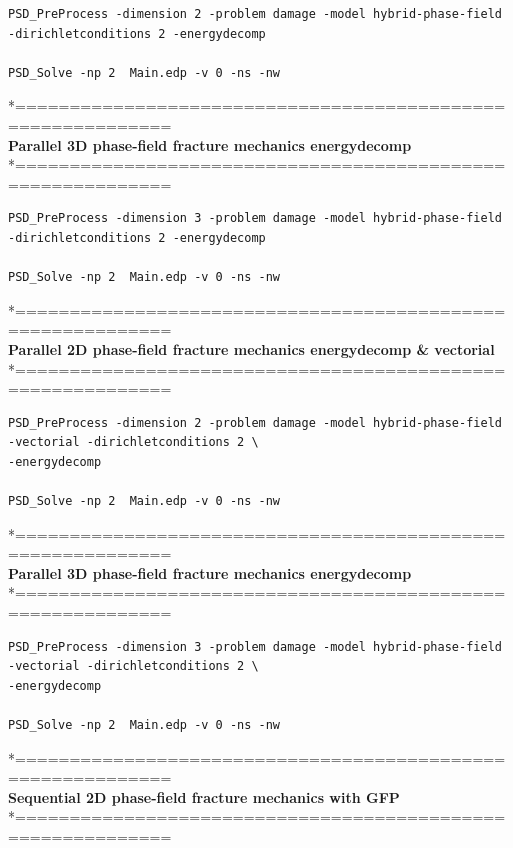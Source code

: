 \begin{lstlisting}[style=BashInputStyle]
PSD_PreProcess -dimension 2 -problem damage -model hybrid-phase-field -dirichletconditions 2 -energydecomp   

PSD_Solve -np 2  Main.edp -v 0 -ns -nw   
\end{lstlisting}
*============================================================\\
\textbf{ Parallel 3D phase-field fracture mechanics energydecomp }\\
*============================================================\\
\begin{lstlisting}[style=BashInputStyle]
PSD_PreProcess -dimension 3 -problem damage -model hybrid-phase-field -dirichletconditions 2 -energydecomp   

PSD_Solve -np 2  Main.edp -v 0 -ns -nw   
\end{lstlisting}
*============================================================\\
\textbf{ Parallel 2D phase-field fracture mechanics energydecomp \& vectorial}\\
*============================================================\\
\begin{lstlisting}[style=BashInputStyle]
PSD_PreProcess -dimension 2 -problem damage -model hybrid-phase-field -vectorial -dirichletconditions 2 \
-energydecomp   

PSD_Solve -np 2  Main.edp -v 0 -ns -nw   
\end{lstlisting}
*============================================================\\
\textbf{ Parallel 3D phase-field fracture mechanics energydecomp }\\
*============================================================\\
\begin{lstlisting}[style=BashInputStyle]
PSD_PreProcess -dimension 3 -problem damage -model hybrid-phase-field -vectorial -dirichletconditions 2 \
-energydecomp   

PSD_Solve -np 2  Main.edp -v 0 -ns -nw   
\end{lstlisting}
*============================================================\\
\textbf{ Sequential 2D phase-field fracture mechanics with GFP }\\
*============================================================\\

